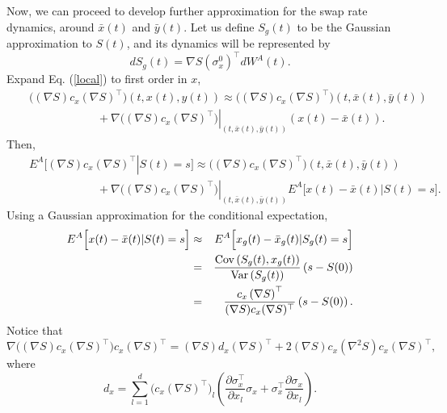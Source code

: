\documentclass[12pt]{article}
\begin{document}
    Now, we can proceed to develop further approximation for the swap rate dynamics, around $\bar{x}(t)$ and $\bar{y}(t)$. Let us define $S_g(t)$ to be the Gaussian
    approximation to $S(t)$, and its dynamics will be represented by
    \begin{equation}
      dS_g(t)=\nabla S(\sigma_x^0)^{\top}dW^A(t).
    \end{equation}
    Expand Eq. (\ref{local})
    to first order in $x$,
    \begin{eqnarray}
      &&\Big((\nabla S) c_x (\nabla S)^{\top}\Big)\left(t,x(t),y(t)\right)
        \approx \Big((\nabla S) c_x (\nabla S)^{\top}\Big)\left(t,\bar{x}(t),\bar{y}(t)\right)\nonumber\\
        &&\quad\quad\quad\quad\quad\quad +\left.\nabla\Big((\nabla S) c_x (\nabla S)^{\top}\Big)\right|_{\left(t,\bar{x}(t),\bar{y}(t)\right)}\left(x(t)-\bar{x}(t)\right).
    \end{eqnarray}
    Then,
    \begin{eqnarray}
      && E^A\bigg[\left.(\nabla S) c_x (\nabla S)^{\top}\right|S(t)=s\bigg]
          \approx \Big((\nabla S) c_x (\nabla S)^{\top}\Big)\left(t,\bar{x}(t),\bar{y}(t)\right)\nonumber\\
        &&\quad\quad\quad\quad\quad\quad +\left.\nabla\Big((\nabla S) c_x (\nabla S)^{\top}\Big)\right|_{\left(t,\bar{x}(t),\bar{y}(t)\right)}
              E^A\Big[x(t)-\bar{x}(t)|S(t)=s\Big].
    \end{eqnarray}
    Using a Gaussian approximation for the conditional expectation,
    \begin{eqnarray}
      E^A\Big[x(t)-\bar{x}(t)|S(t)=s\Big] &\approx& E^A\Big[x_g(t)-\bar{x}_g(t)|S_g(t)=s\Big]\nonumber\\
                &=& \frac{{\rm Cov}\left(S_g(t),x_g(t)\right)}{{\rm Var}\left(S_g(t)\right)}\left(s-S(0)\right)\nonumber\\
                &=& \frac{c_x\left(\nabla S\right)^{\top}}{(\nabla S) c_x (\nabla S)^{\top}}\left(s-S(0)\right).
    \end{eqnarray}
    Notice that
    \begin{equation}
      \nabla\Big((\nabla S) c_x (\nabla S)^{\top}\Big)c_x\left(\nabla S\right)^{\top}
        = (\nabla S) d_x (\nabla S)^{\top} + 2(\nabla S) c_x (\nabla^2 S) c_x (\nabla S)^{\top},
    \end{equation}
    where
    \begin{equation}
      d_x=\sum_{l=1}^d \Big(c_x (\nabla S)^{\top}\Big)_l
                \left(\frac{\partial \sigma_x^{\top}}{\partial x_l}\sigma_x+\sigma_x^{\top}\frac{\partial \sigma_x}{\partial x_l}\right).
    \end{equation}
\end{document}

